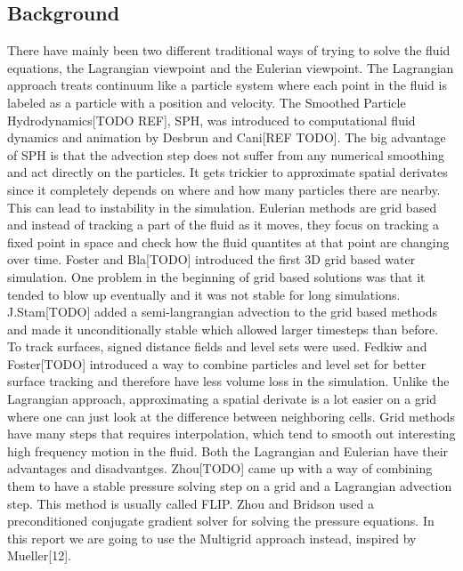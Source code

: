 \subsection{Background}

There have mainly been two different traditional ways of trying to solve the fluid equations, the Lagrangian viewpoint and the Eulerian viewpoint. The Lagrangian approach treats continuum like a particle system where each point in the fluid is labeled as a particle with a position and velocity. The Smoothed Particle Hydrodynamics[TODO REF], SPH, was introduced to computational fluid dynamics and animation by Desbrun and Cani[REF TODO]. The big advantage of SPH is that the advection step does not suffer from any numerical smoothing and act directly on the particles. It gets trickier to approximate spatial derivates since it completely depends on where and how many particles there are nearby. This can lead to instability in the simulation. Eulerian methods are grid based and instead of tracking a part of the fluid as it moves, they focus on tracking a fixed point in space and check how the fluid quantites at that point are changing over time. Foster and Bla[TODO] introduced the first 3D grid based water simulation. One problem in the beginning of grid based solutions was that it tended to blow up eventually and it was not stable for long simulations. J.Stam[TODO] added a semi-langrangian advection to the grid based methods and made it unconditionally stable which allowed larger timesteps than before. To track surfaces, signed distance fields and level sets were used. Fedkiw and Foster[TODO] introduced a way to combine particles and level set for better surface tracking and therefore have less volume loss in the simulation. Unlike the Lagrangian approach, approximating a spatial derivate is a lot easier on a grid where one can just look at the difference between neighboring cells. Grid methods have many steps that requires interpolation, which tend to smooth out interesting high frequency motion in the fluid.
\newline
\newline
Both the Lagrangian and Eulerian have their advantages and disadvantges. Zhou[TODO] came up with a way of combining them to have a stable pressure solving step on a grid and a Lagrangian advection step. This method is usually called FLIP. Zhou and Bridson used a preconditioned conjugate gradient solver for solving the pressure equations. In this report we are going to use the Multigrid approach instead, inspired by Mueller[12].
